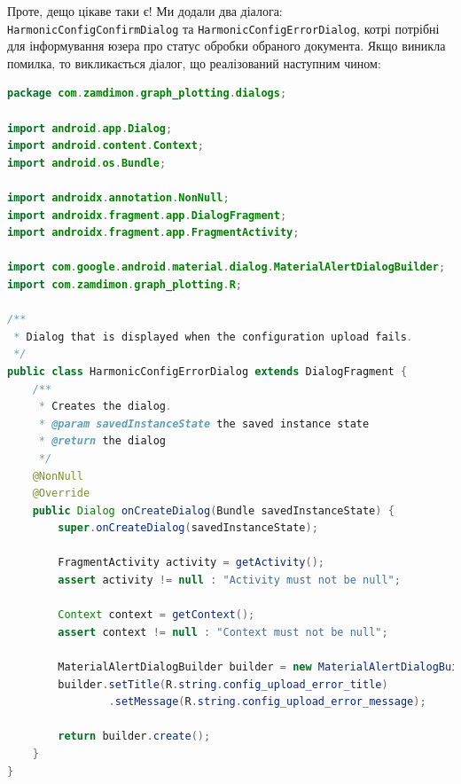 \documentclass[oneside,solution]{android-assign}
\begin{document}
Проте, дещо цікаве таки є! Ми додали два діалога: \texttt{HarmonicConfigConfirmDialog} та \texttt{HarmonicConfigErrorDialog}, котрі потрібні для інформування юзера про статус обробки обраного документа. Якщо виникла помилка, то викликається діалог, що реалізований наступним чином:
\begin{lstlisting}[language=java]
package com.zamdimon.graph_plotting.dialogs;

import android.app.Dialog;
import android.content.Context;
import android.os.Bundle;

import androidx.annotation.NonNull;
import androidx.fragment.app.DialogFragment;
import androidx.fragment.app.FragmentActivity;

import com.google.android.material.dialog.MaterialAlertDialogBuilder;
import com.zamdimon.graph_plotting.R;

/**
 * Dialog that is displayed when the configuration upload fails.
 */
public class HarmonicConfigErrorDialog extends DialogFragment {
    /**
     * Creates the dialog.
     * @param savedInstanceState the saved instance state
     * @return the dialog
     */
    @NonNull
    @Override
    public Dialog onCreateDialog(Bundle savedInstanceState) {
        super.onCreateDialog(savedInstanceState);

        FragmentActivity activity = getActivity();
        assert activity != null : "Activity must not be null";

        Context context = getContext();
        assert context != null : "Context must not be null";

        MaterialAlertDialogBuilder builder = new MaterialAlertDialogBuilder(activity);
        builder.setTitle(R.string.config_upload_error_title)
                .setMessage(R.string.config_upload_error_message);

        return builder.create();
    }
}
\end{lstlisting}
\end{document}
